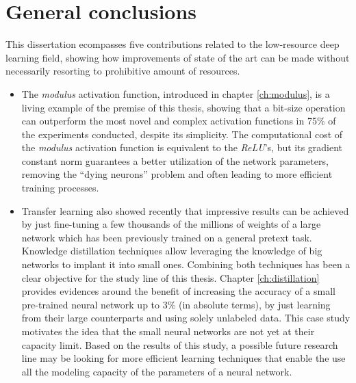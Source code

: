 
\chapter{General conclusions} \label{ch:conclusions}
This dissertation ecompasses five contributions related to the low-resource deep learning field, showing how improvements of state of the art can be made without necessarily resorting to prohibitive amount of resources. 

\begin{itemize}
\item The \textit{modulus} activation function, introduced in chapter \ref{ch:modulus}, is a living example of the premise of this thesis, showing that a bit-size operation can outperform the most novel and complex activation functions in 75\% of the experiments conducted, despite its simplicity. The computational cost of the \textit{modulus} activation function is equivalent to the \textit{ReLU}'s, but its gradient constant  norm guarantees a better utilization of the network parameters, removing the ``dying neurons'' problem and often leading to more efficient training processes.

\item Transfer learning also showed recently that impressive results can be achieved by just fine-tuning a few thousands of the millions of weights of a large network which has been previously trained on a general pretext task. Knowledge distillation techniques allow leveraging the knowledge of big networks to implant it into small ones. Combining both techniques has been a clear objective for the study line of this thesis. Chapter \ref{ch:distillation} provides evidences around the benefit of increasing the accuracy of a small pre-trained neural network up to 3\% (in absolute terms), by just learning from their large counterparts and using solely unlabeled data. This case study motivates the idea that the small neural networks are not yet at their capacity limit. Based on the results of this study, a possible future research line may be looking for more efficient learning techniques that enable the use all the modeling capacity of the parameters of a neural network.


\end{itemize}
